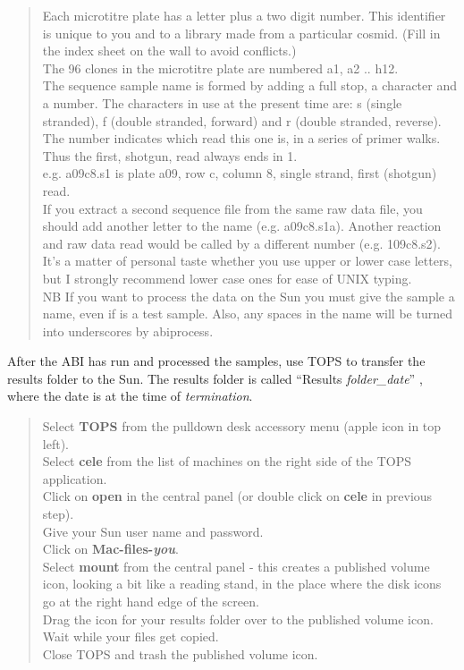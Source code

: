 \begin{verse}
Each microtitre plate has a letter plus a two digit number.  This
identifier is unique to you and to a library made from a particular
cosmid. (Fill in the index sheet on the wall to avoid conflicts.)\\
The 96 clones in the microtitre plate are numbered a1, a2 .. h12.\\
The sequence sample name is formed by adding a full stop, a character
and a number.  The characters in use at the present time are: s
(single stranded), f (double stranded, forward) and r (double
stranded, reverse).   The number indicates which read  this one is,
in a series of primer walks. Thus the first, shotgun, read always ends
in 1.\\
e.g. a09c8.s1 is plate a09, row c, column 8, single strand, first
(shotgun) read.\\
If you extract a second sequence file from the same raw data file, you
should add another letter to the name (e.g. a09c8.s1a).  Another
reaction and raw data read would be called by a different number (e.g.
109c8.s2).
It's a matter of personal taste whether you use upper or lower case
letters, but I strongly recommend lower case ones for ease of UNIX typing.\\
NB  If you want to process the data on the Sun you must give the
sample a name, even if is a test sample.  Also, any spaces in the name
will be turned into underscores by {\sf abiprocess}.\\
\end{verse}

After the ABI has run and processed the samples, use TOPS to transfer
the results folder to the Sun.  The results folder is called ``Results
{\em folder\_date}'' , where the date is at the time of {\em
termination}.
\begin{verse}
Select {\bf TOPS} from the pulldown desk accessory menu (apple icon in top left).\\
Select {\bf cele} from the list of machines on the right side of the
TOPS application.\\
Click on {\bf open} in the central panel (or double click on {\bf cele} in previous step).\\
Give your Sun user name and password.\\
Click on {\bf Mac-files-{\em you}}.\\
Select {\bf mount} from the central panel - this creates a published
volume icon, looking a bit like a reading stand, in the place where the disk 
icons go at the right hand edge of the screen.\\
Drag the icon for your results folder over to the published volume icon.\\
Wait while your files get copied.\\
Close TOPS and trash the published volume icon.\\
\end{verse}

